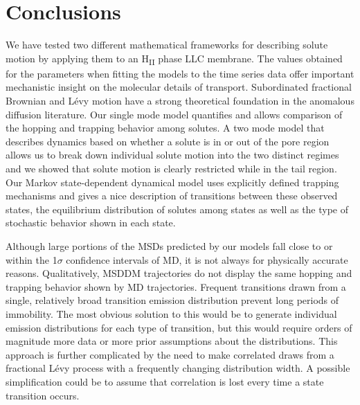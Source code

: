 \documentclass[aps,pre,preprint,groupedaddress,longbibliography]{revtex4-2}
\begin{document}
  \section{Conclusions}
  
  We have tested two different mathematical frameworks for describing solute
  motion by applying them to an H\textsubscript{II} phase LLC membrane. The values
  obtained for the parameters when fitting the models to the time series data 
  offer important mechanistic insight on the molecular details of transport.
  Subordinated fractional Brownian and L\'evy motion have a strong theoretical 
  foundation in the anomalous diffusion literature. Our single mode model
  quantifies and allows comparison of the hopping and trapping behavior 
  among solutes. A two mode model that describes dynamics based on whether
  a solute is in or out of the pore region allows us to break down individual
  solute motion into the two distinct regimes and we showed that solute motion is
  clearly restricted while in the tail region. Our Markov state-dependent dynamical
  model uses explicitly defined trapping mechanisms and gives a nice description 
  of transitions between these observed states, the equilibrium distribution of 
  solutes among states as well as the type of stochastic behavior shown in each 
  state. 
  
  Although large portions of the MSDs predicted by our models fall close to or 
  within the 1$\sigma$ confidence intervals of MD, it is not always for physically
  accurate reasons. Qualitatively, MSDDM trajectories do not display the same hopping
  and trapping behavior shown by MD trajectories. Frequent transitions drawn from a
  single, relatively broad transition emission distribution prevent long periods of
  immobility. The most obvious solution to this would be to generate individual emission
  distributions for each type of transition, but this would require orders of magnitude
  more data or more prior assumptions about the distributions.
  This approach is further complicated by the need to make correlated draws
  from a fractional L\'evy process with a frequently changing distribution width. 
  A possible simplification could be to assume that correlation is lost every time a
  state transition occurs.
\end{document}
